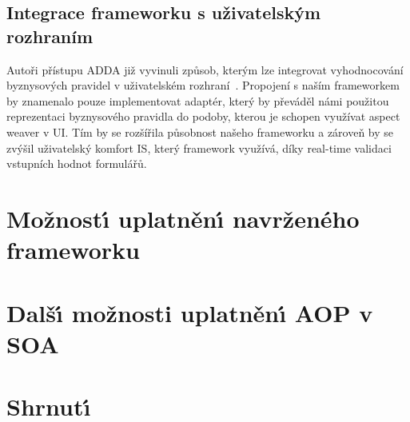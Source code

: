 \subsection{Integrace frameworku s uživatelským rozhraním}

Autoři přístupu \gls{ADDA} již vyvinuli způsob, kterým lze integrovat vyhodnocování
byznysových pravidel v uživatelském rozhraní~\cite{cemus2017separation}. Propojení s
naším frameworkem by znamenalo pouze implementovat adaptér, který by převáděl námi
použitou reprezentaci byznysového pravidla do podoby, kterou je schopen využívat
aspect weaver v \gls{UI}. Tím by se rozšířila působnost našeho frameworku a zároveň
by se zvýšil uživatelský komfort \gls{IS}, který framework využívá, díky real-time
validaci vstupních hodnot formulářů.

\section{Možnost\'{\i} uplatněn\'{\i} navrženého frameworku}

\section{Dalš\'{\i} možnosti uplatněn\'{\i} \gls{AOP} v \gls{SOA}}


\section{Shrnut\'{\i}}

